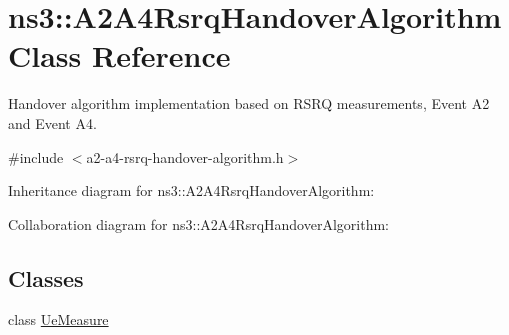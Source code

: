 \hypertarget{classns3_1_1A2A4RsrqHandoverAlgorithm}{}\section{ns3\+:\+:A2\+A4\+Rsrq\+Handover\+Algorithm Class Reference}
\label{classns3_1_1A2A4RsrqHandoverAlgorithm}


Handover algorithm implementation based on R\+S\+RQ measurements, Event A2 and Event A4.  




{\ttfamily \#include $<$a2-\/a4-\/rsrq-\/handover-\/algorithm.\+h$>$}



Inheritance diagram for ns3\+:\+:A2\+A4\+Rsrq\+Handover\+Algorithm\+:


Collaboration diagram for ns3\+:\+:A2\+A4\+Rsrq\+Handover\+Algorithm\+:
\subsection*{Classes}
\begin{DoxyCompactItemize}
\item 
class \hyperlink{classns3_1_1A2A4RsrqHandoverAlgorithm_1_1UeMeasure}{Ue\+Measure}
\end{DoxyCompactItemize}
